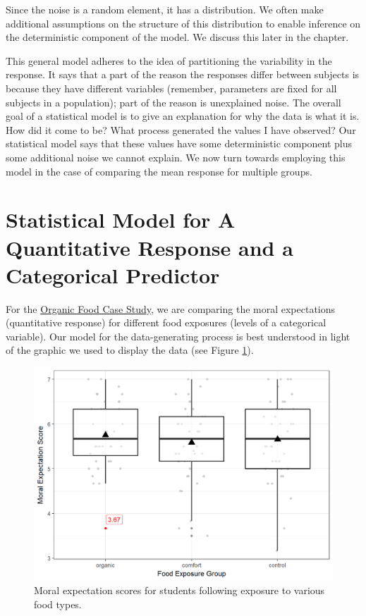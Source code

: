 \documentclass[]{book}
\theoremstyle{definition}
\theoremstyle{definition}
\theoremstyle{definition}
\theoremstyle{remark}
\begin{document}
Since the noise is a random element, it has a distribution. We often
make additional assumptions on the structure of this distribution to
enable inference on the deterministic component of the model. We discuss
this later in the chapter.

This general model adheres to the idea of partitioning the variability
in the response. It says that a part of the reason the responses differ
between subjects is because they have different variables (remember,
parameters are fixed for all subjects in a population); part of the
reason is unexplained noise. The overall goal of a statistical model is
to give an explanation for why the data is what it is. How did it come
to be? What process generated the values I have observed? Our
statistical model says that these values have some deterministic
component plus some additional noise we cannot explain. We now turn
towards employing this model in the case of comparing the mean response
for multiple groups.

\section{Statistical Model for A Quantitative Response and a Categorical
Predictor}\label{statistical-model-for-a-quantitative-response-and-a-categorical-predictor}

For the \protect\hyperlink{CaseOrganic}{Organic Food Case Study}, we are
comparing the moral expectations (quantitative response) for different
food exposures (levels of a categorical variable). Our model for the
data-generating process is best understood in light of the graphic we
used to display the data (see Figure \ref{fig:anovamodel-organic-plot}).

\begin{figure}

{\centering \includegraphics[width=0.8\linewidth]{./Images/anovamodel-organic-plot-1} 

}

\caption{Moral expectation scores for students following exposure to various food types.}\label{fig:anovamodel-organic-plot}
\end{figure}
\end{document}
